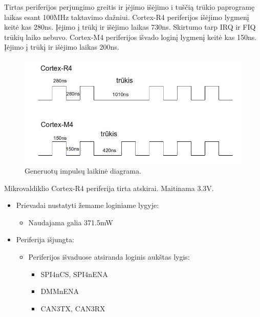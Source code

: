 \documentclass[a4paper, 12pt]{article} %
\begin{document}
\begin{onehalfspacing}
Tirtas periferijos perjungimo greitis ir \k{i}\.ejimo i\v{s}\.ejimo i tu\v{s}\v{c}i\k{a} tr\=ukio paprogram\k{e} laikas esant 100MHz taktavimo da\v{z}niui.  
Cortex-R4 periferijos i\v{s}\.ejimo lygmen\k{i} keit\.{e} kas 280ns. \k{I}\.ejimo \k{i} tr\=uk\k{i} ir i\v{s}\.ejimo laikas 730ns. Skirtumo tarp IRQ ir FIQ tr\=uki\k{u} laiko nebuvo. Cortex-M4 periferijos i\v{s}vado login\k{i} lygmen\k{i} keit\.e kas 150ns. \k{I}\.ejimo \k{i} tr\=uk\k{i} ir i\v{s}\.ejimo laikas 200ns.
\begin{figure}[H] %
\centering %
\includegraphics[scale=0.4]{pav/trukiai.jpg} %
\captionsetup{labelformat=numbfirst} %
\captionsetup{labelseparator=tarpas}
\caption{Generuot\k{u} impuls\k{u} laikin\.e diagrama.}
\label{vienas}
\end{figure}
Mikrovaldiklio Cortex-R4 periferija tirta atskirai. Maitinama 3.3V.
\begin{itemize}
\item Prievadai nustatyti \v{z}emame loginiame lygyje:
\begin{itemize}
\item Naudajama galia 371.5mW
\end{itemize}
\item Periferija i\v{s}jungta:
\begin{itemize}
\item Periferijos i\v{s}vaduose atsiranda loginis auk\v{s}tas lygis:
\begin{itemize}
\item SPI4nCS, SPI4nENA
\item DMMnENA
\item CAN3TX, CAN3RX
\end{itemize}

\end{itemize}
\end{itemize}
\end{onehalfspacing}
\end{document}
